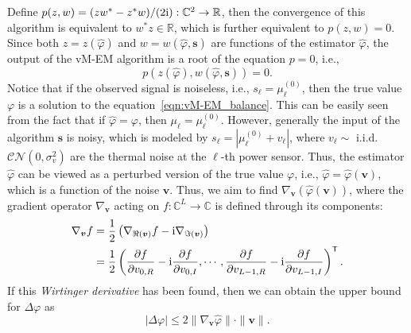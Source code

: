 \documentclass[a4paper,12pt]{article}
\def \T {^{\mathsf{T}}}
\def \ri {{\rm i}}
\begin{document}
Define $p(z,w) = (zw^* - z^*w)/(2\ri): \mathbb{C}^2 \to \mathbb{R}$, then the convergence of this algorithm is equivalent to $w^*z\in\mathbb{R}$, which is further equivalent to $p(z,w)=0$. Since both $z=z(\hat{\varphi})$ and $w=w(\hat{\varphi}, {\bm s})$ are functions of the estimator $\hat{\varphi}$, the output of the vM-EM algorithm is a root of the equation $p=0$, i.e.,  
\begin{equation}
    p(z(\hat{\varphi}),w(\hat{\varphi}, {\bm s}))=0 .
    \label{eqn:vM-EM_balance}
\end{equation}
Notice that if the observed signal is noiseless, i.e., $s_\ell = \mu_\ell^{(0)}$, then the true value $\varphi$ is a solution to the equation~\eqref{eqn:vM-EM_balance}. This can be easily seen from the fact that if $\hat{\varphi} = \varphi$, then $\mu_\ell = \mu_\ell^{(0)}$.
However, generally the input of the algorithm ${\bm s}$ is noisy, which is modeled by $s_\ell = |\mu_\ell^{(0)} + v_\ell|$, where $v_\ell \sim$ i.i.d. $\mathcal{CN}(0, \sigma_v^2)$ are the thermal noise at the $\ell$-th power sensor. Thus, the estimator $\hat\varphi$ can be viewed as a perturbed version of the true value $\varphi$, i.e., $\hat{\varphi} = \hat{\varphi}(\bm v)$, which is a function of the noise $\bm v$. Thus, we aim to find $\nabla_{\bm v}(\hat{\varphi}({\bm v}))$, where the gradient operator $\nabla_{{\bm v}}$ acting on $f: \mathbb{C}^L\to \mathbb{C}$ is defined through its components:
\begin{equation}
    \begin{aligned}
    \nabla_{\bm v}f &= \frac{1}{2}\left( \nabla_{\Re({\bm v})} f -\ri \nabla_{\Im({\bm v})} \right) \\
    &={\frac{1}{2}} \left( \frac{\partial f}{\partial v_{0, R}} -\ri \frac{\partial f}{\partial v_{0, I}}, \cdots,  \frac{\partial f}{\partial v_{L-1, R}} -\ri \frac{\partial f}{\partial v_{L-1, I}}\right)\T. 
    \end{aligned}
\end{equation}
If this {\it Wirtinger derivative} has been found, then we can obtain the upper bound for $\Delta\varphi$ as 
\begin{equation}
    |\Delta\varphi|\leq 2\|\nabla_{\bm v}\hat{\varphi} \|\cdot \|{\bm v}\|. 
\end{equation}
\end{document}

